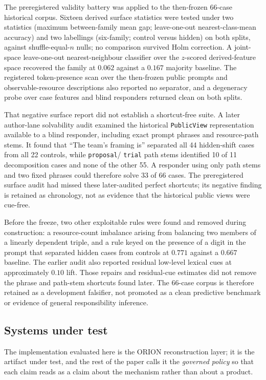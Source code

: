 The preregistered validity battery was applied to the then-frozen 66-case
historical corpus. Sixteen derived surface statistics were tested under two
statistics (maximum between-family mean gap; leave-one-out
nearest-class-mean accuracy) and two labellings (six-family; control versus
hidden) on both splits, against shuffle-equal-$n$ nulls; no comparison survived
Holm correction. A joint-space leave-one-out nearest-neighbour classifier over
the $z$-scored derived-feature space recovered the family at $0.062$ against a
$0.167$ majority baseline. The registered token-presence scan over the
then-frozen public prompts and observable-resource descriptions also reported
no separator, and a degeneracy probe over case features and blind responders
returned clean on both splits.

That negative surface report did not establish a shortcut-free suite. A later
author-lane solvability audit examined the historical \texttt{PublicView}
representation available to a blind responder, including exact prompt phrases
and resource-path stems. It found that ``The team's framing is'' separated all
44 hidden-shift cases from all 22 controls, while \texttt{proposal}/
\texttt{trial} path stems identified 10 of 11 decomposition cases and none of
the other 55. A responder using only path stems and two fixed phrases could
therefore solve 33 of 66 cases. The preregistered surface audit had missed these
later-audited perfect shortcuts; its negative finding is retained as chronology,
not as evidence that the historical public views were cue-free.

Before the freeze, two other exploitable rules were found and removed during
construction: a resource-count imbalance arising from balancing two members of
a linearly dependent triple, and a rule keyed on the presence of a digit in the
prompt that separated hidden cases from controls at $0.771$ against a $0.667$
baseline. The earlier audit also reported residual low-level lexical cues at
approximately $0.10$ lift. Those repairs and residual-cue estimates did not
remove the phrase and path-stem shortcuts found later. The 66-case corpus is
therefore retained as a development falsifier, not promoted as a clean
predictive benchmark or evidence of general responsibility inference.

\subsection{Systems under test}

The implementation evaluated here is the ORION reconstruction layer; it is the
artifact under test, and the rest of the paper calls it the \emph{governed
policy} so that each claim reads as a claim about the mechanism rather than
about a product.

